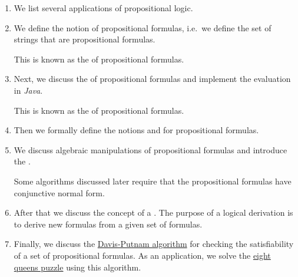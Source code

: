 \begin{enumerate}
\item We list several applications of propositional logic.
\item We define the notion of propositional formulas, i.e.~we define the set of strings that are
      propositional formulas.

      This is known as the  of propositional formulas.
\item Next, we discuss the  of propositional formulas and implement the evaluation in \textsl{Java}.

      This is known as the  of propositional formulas.
\item Then we formally define the notions  and  for propositional formulas.   
\item We discuss algebraic manipulations of propositional formulas and introduce the 
      .

      Some algorithms discussed later require that the propositional formulas have conjunctive normal form.
\item After that we discuss the concept of a .  The purpose of a logical derivation is to
      derive new formulas from a given set of formulas.
\item Finally, we discuss the \href{https://en.wikipedia.org/wiki/Davis–Putnam_algorithm}{Davis-Putnam
      algorithm} for checking the satisfiability of a set of  propositional formulas.  As an application, we
      solve the \href{https://en.wikipedia.org/wiki/Eight_queens_puzzle}{eight queens puzzle} using this algorithm.
\end{enumerate}

